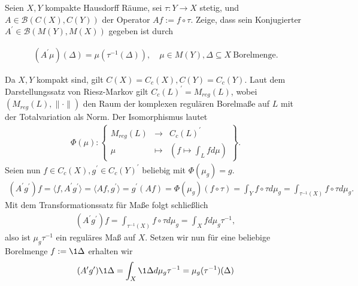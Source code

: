 \begin{exercise}

Seien $X, Y$ kompakte Hausdorff Räume, sei $\tau: Y \to X$ stetig, und $A \in \mathcal{B}(C(X), C(Y))$ der Operator $A f := f \circ \tau$.
Zeige, dass sein Konjugierter $A^\prime \in \mathcal{B}(M(Y), M(X))$ gegeben ist durch

\begin{align*}
  (A^\prime \mu)(\Delta) = \mu(\tau^{-1}(\Delta)),
  \quad
  \mu \in M(Y), \Delta \subseteq X ~\text{Borelmenge}.
\end{align*}

\end{exercise}

\begin{solution}
Da $X,Y$ kompakt sind, gilt $C(X) = C_c(X), C(Y) = C_c(Y)$.
Laut dem Darstellungssatz von Riesz-Markov gilt $C_c(L)^{\prime} = M_{reg}(L)$,
wobei $(M_{reg}(L), \|\cdot\|)$ den Raum der komplexen regulären Borelmaße auf $L$
mit der Totalvariation als Norm.
Der Isomorphismus lautet
\begin{align*}
  \Phi(\mu): \begin{Bmatrix}
    M_{reg}(L) & \to & C_c(L)^{\prime} \\
    \mu & \mapsto & (f \mapsto \int_L f d\mu)
  \end{Bmatrix}.
\end{align*}
Seien nun $f \in C_c(X), g^{\prime} \in C_c(Y)^{\prime}$ beliebig mit $\Phi(\mu_g) = g$.
\begin{align*}
  (A^{\prime}g^{\prime})f = \langle f, A^{\prime}g^{\prime} \rangle = \langle A f, g^{\prime} \rangle
  = g^{\prime}(Af) = \Phi(\mu_g)(f \circ \tau)
  = \int_Y f\circ \tau d\mu_g
  = \int_{\tau^{-1}(X)} f \circ \tau d\mu_g.
\end{align*}
Mit dem Transformationssatz für Maße folgt schließlich
\begin{align*}
  (A^{\prime}g^{\prime})f = \int_{\tau^{-1}(X)} f \circ \tau d\mu_g
  = \int_{X} f d\mu_g\tau^{-1},
\end{align*}
also ist $\mu_g\tau^{-1}$ ein reguläres Maß auf $X$.
Setzen wir nun für eine beliebige Borelmenge $f := \1\Delta$ erhalten wir
\begin{align*}
  (A^{\prime}g^{\prime})\1\Delta = \int_{X} \1\Delta d\mu_g\tau^{-1}
  = \mu_g(\tau^{-1})(\Delta)
\end{align*}
\end{solution}
